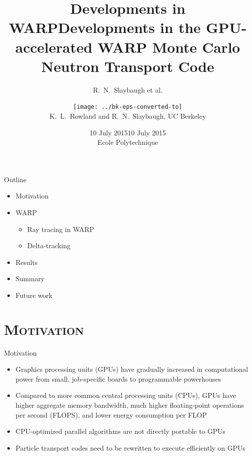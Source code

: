 \documentclass[xcolor=x11names, compress]{beamer}
\title{Developments in WARP}
\author{R.\ N.\ Slaybaugh et al.}
\date{10 July 2015}
\renewcommand{\(}{\begin{columns}}
\renewcommand{\)}{\end{columns}}
\newcommand{\<}[1]{\begin{column}{#1}}
\renewcommand{\>}{\end{column}}
\begin{document}
\begin{frame}[plain]
\title{Developments in the GPU-accelerated WARP Monte Carlo Neutron Transport Code}
\author{\texttt{[image: ../bk-eps-converted-to]}\\\vspace*{1 em} K.\ L.\ Rowland and R.\ N.\ Slaybaugh, UC Berkeley}%
\date{10 July 2015 \\ Ecole Polytechnique}
\titlepage
\end{frame}


\begin{frame}[fragile]{Outline}
	\begin{itemize}
	\item{Motivation}
	\item{WARP}
	\begin{itemize}
	    \item{Ray tracing in WARP}
	    \item{Delta-tracking}
	\end{itemize}
	\item{Results}
	\item{Summary}
	\item{Future work}
	\end{itemize}
\end{frame}


\section{\scshape Motivation}
\begin{frame}{Motivation}
	\begin{itemize}
	\item{Graphics processing units (GPUs) have gradually increased in computational power from small,
	job-specific boards to programmable powerhouses}
	\pause
	\item{Compared to more common central processing units (CPUs), GPUs have higher aggregate memory
	bandwidth, much higher floating-point operations per second (FLOPS), and lower energy consumption
	per FLOP \cite{warp}}
	\pause
	\item{CPU-optimized parallel algorithms are not directly portable to GPUs}
	\pause
	\item{Particle transport codes need to be rewritten to execute efficiently on GPUs 
	\cite{warp}}
	\end{itemize}
\end{frame}
\end{document}
